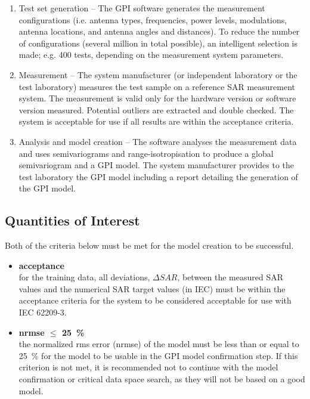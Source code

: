 \documentclass{article}
\begin{document}
\begin{enumerate}[label=\arabic*)]
\item Test set generation -- The GPI software generates the measurement configurations (i.e. antenna types, frequencies, power levels, modulations, antenna locations, and antenna angles and distances). To reduce the number of configurations (several million in total possible), an intelligent selection is made; e.g. 400 tests, depending on the measurement system parameters.
\item Measurement -- The system manufacturer (or independent laboratory or the test laboratory) measures the test sample on a reference SAR measurement system. The measurement is valid only for the hardware version or software version measured. Potential outliers are extracted and double checked. The system is acceptable for use if all results are within the acceptance criteria.
\item Analysis and model creation -- The software analyses the measurement data and uses semivariograms and range-isotropisation to produce a global semivariogram and a GPI model. The system manufacturer provides to the test laboratory the GPI model including a report detailing the generation of the GPI model.
\end{enumerate}

\subsection{Quantities of Interest}\label{sec:quantities}

Both of the criteria below must be met for the model creation to be successful.

\begin{itemize}
\item \textbf{acceptance}\\ for the training data, all deviations, $\Delta SAR$, between the measured SAR values and the numerical SAR target values (in IEC)  must be within the acceptance criteria for the system to be considered acceptable for use with IEC 62209-3.

\item \textbf{nrmse $\le$ 25~\%}\\ the normalized rms error (nrmse) of the model must be less than or equal to 25~\% for the model to be usable in the GPI model confirmation step. If this criterion is not met, it is recommended not to continue with the model confirmation or critical data space search, as they will not be based on a good model.
\end{itemize}
\end{document}
